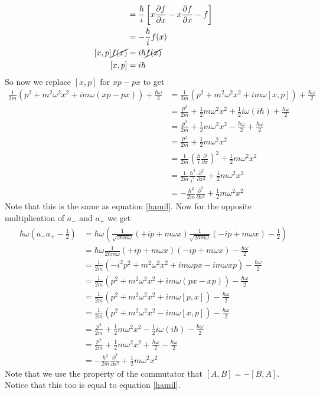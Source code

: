 \documentclass[11pt]{article}
\numberwithin{equation}{section}
\begin{document}
\begin{enumerate}[(a)]
\begin{align*}
&= \frac{\hbar}{i}\left[x\frac{\partial f}{\partial x}-x\frac{\partial f}{\partial x}-f\right]\\
&= -\frac{\hbar}{i}f(x)\\
[x,p]\cancel{f(x)} &= i\hbar \cancel{f(x)}\\
[x,p] &= i\hbar
\end{align*}
So now we replace $[x,p]$ for $xp-px$ to get
\begin{align*}
\frac{1}{2m}\left(p^2+m^2\omega^2 x^2+im\omega(xp-px)\right) + \frac{\hbar\omega}{2} &= \frac{1}{2m}\left(p^2+m^2\omega^2 x^2+im\omega[x,p]\right) + \frac{\hbar\omega}{2}\\
&= \frac{p^2}{2m}+\frac{1}{2}m\omega^2 x^2+\frac{1}{2}i\omega(i\hbar) + \frac{\hbar\omega}{2}\\
&= \frac{p^2}{2m}+\frac{1}{2}m\omega^2 x^2 - \frac{\hbar\omega}{2} + \frac{\hbar\omega}{2}\\
&= \frac{p^2}{2m}+\frac{1}{2}m\omega^2 x^2 \\
&= \frac{1}{2m}\left(\frac{\hbar}{i}\frac{\partial}{\partial x}\right)^2+\frac{1}{2}m\omega^2 x^2 \\
&= \frac{1}{2m}\frac{\hbar^2}{i^2}\frac{\partial^2}{\partial x^2}+\frac{1}{2}m\omega^2 x^2 \\
&= -\frac{\hbar^2}{2m}\frac{\partial^2}{\partial x^2}+\frac{1}{2}m\omega^2 x^2 
\end{align*}
Note that this is the same as equation \ref{hamil}. Now for the opposite multiplication of $a_-$ and $a_+$ we get
\begin{align*}
\hbar\omega\left(a_-a_+-\frac{1}{2}\right) &= \hbar\omega\left(\frac{1}{\sqrt{2\hbar m\omega}}(+ip+m\omega x)\frac{1}{\sqrt{2\hbar m\omega}}(-ip+m\omega x) - \frac{1}{2}\right)\\
&= \hbar\omega\frac{1}{2\hbar m\omega}(+ip+m\omega x)(-ip+m\omega x)-\frac{\hbar\omega}{2} \\
&= \frac{1}{2m}\left(-i^2p^2+m^2\omega^2 x^2+im\omega px-im\omega xp\right) - \frac{\hbar\omega}{2}\\
&= \frac{1}{2m}\left(p^2+m^2\omega^2 x^2+im\omega(px-xp)\right) - \frac{\hbar\omega}{2}\\
&= \frac{1}{2m}\left(p^2+m^2\omega^2 x^2+im\omega[p,x]\right) - \frac{\hbar\omega}{2}\\
&= \frac{1}{2m}\left(p^2+m^2\omega^2 x^2 - im\omega[x,p]\right) - \frac{\hbar\omega}{2}\\
&= \frac{p^2}{2m}+\frac{1}{2}m\omega^2 x^2 - \frac{1}{2}i\omega(i\hbar) - \frac{\hbar\omega}{2}\\
&= \frac{p^2}{2m}+\frac{1}{2}m\omega^2 x^2 + \frac{\hbar\omega}{2} - \frac{\hbar\omega}{2}\\
&= -\frac{\hbar^2}{2m}\frac{\partial^2}{\partial x^2}+\frac{1}{2}m\omega^2 x^2 
\end{align*}
Note that we use the property of the commutator that $[A,B] = -[B,A]$. Notice that this too is equal to equation \ref{hamil}.


\end{enumerate}
\end{document}
